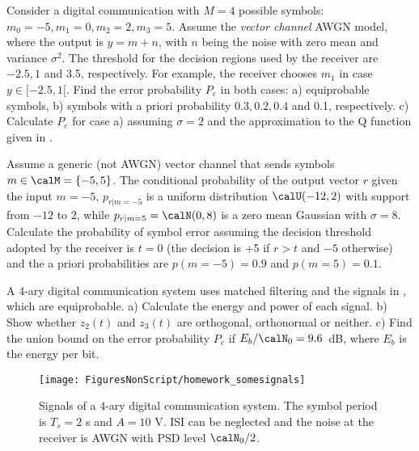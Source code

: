 \begin{exercises}



\item Consider a digital communication with $M=4$ possible symbols: $m_0=-5, m_1=0, m_2=2, m_3=5$. 
Assume the \emph{vector channel} AWGN model, where the output is $y=m+n$, with $n$ being the noise with zero mean and variance $\sigma^2$. The threshold for the decision regions used by the receiver are $-2.5, 1$ and 3.5, respectively. 
For example, the receiver chooses $m_1$ in case $y \in [-2.5, 1[$. Find the error probability $P_e$ in both cases: a) equiprobable symbols, b) symbols with a priori probability $0.3, 0.2, 0.4$ and 0.1, respectively. c) Calculate $P_e$ for case a) assuming $\sigma = 2$ and the approximation to the Q function given in .

\item Assume a generic (not AWGN) vector channel that sends symbols $m \in \calM = \{-5,5\}$. The conditional probability of the output vector $r$ given the input $m=-5$, $p_{r|m=-5}$ is a uniform distribution $\calU(-12,2)$ with support from $-12$ to 2, while $p_{r|m=5} = \calN(0,8)$ is a zero mean Gaussian with $\sigma=8$. Calculate the probability of symbol error assuming the decision threshold adopted by the receiver is $t=0$ (the decision is +5 if $r>t$ and $-5$ otherwise) and the a priori probabilities are $p(m=-5)=0.9$ and $p(m=5)=0.1$.

\item A 4-ary digital communication system uses matched filtering and the signals in 
, which are equiprobable.  
a) Calculate the energy and power of each signal. b) Show whether $z_2(t)$ and $z_3(t)$ are orthogonal, orthonormal or neither. c) Find the union bound on the error probability $P_e$ if $E_b / \calN_0=9.6$~dB, where $E_b$ is the energy per bit.

\begin{figure}[htbp]
\centering
\texttt{[image: FiguresNonScript/homework\_somesignals]}
\caption[{Signals of a 4-ary digital communication system.}]{Signals of a 4-ary digital communication system. The symbol period is $T_s=2$ s and $A=10$ V. ISI can be neglected and the noise at the receiver is AWGN with PSD level $\calN_0 / 2$.\label{fig:homework_somesignals}}
\end{figure}


\end{exercises}
